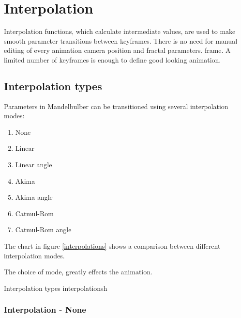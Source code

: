 \section{Interpolation}\label{interpolation}

Interpolation functions, which calculate intermediate values, are used to make smooth parameter transitions between keyframes. There is no need for manual editing of every animation camera position and fractal parameters. 
frame. A limited number of keyframes is enough to define good looking animation.

\subsection{Interpolation types}\label{interpolation-types}

Parameters in Mandelbulber can be transitioned using several interpolation modes:

\begin{multicols}{3}
\begin{enumerate}
	
	\item None

	\item Linear

	\item Linear angle
	
	\item Akima	

	\item Akima angle
	
	\item Catmul-Rom

	\item Catmul-Rom angle
	
\end{enumerate}
\end{multicols}

The chart in figure \ref{interpolations} shows a comparison between different interpolation modes.

The choice of mode, greatly effects the animation.

{Interpolation types}
{interpolations}{h}

\subsubsection{Interpolation - None}\label{interpolation-none}

